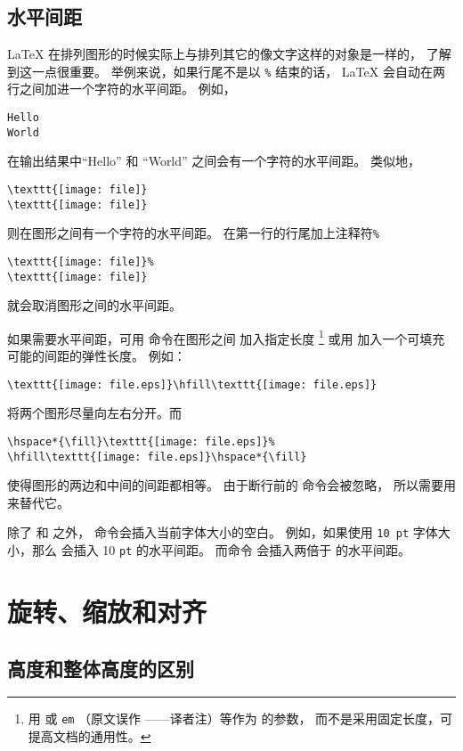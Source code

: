 \subsection{水平间距}\label{ssec:hspace}
\LaTeX{} 在排列图形的时候实际上与排列其它的像文字这样的对象是一样的，
了解到这一点很重要。
举例来说，如果行尾不是以 \texttt{\%} 结束的话，
\LaTeX{} 会自动在两行之间加进一个字符的水平间距。
例如，
\begin{lstlisting}
Hello
World
\end{lstlisting}
在输出结果中``Hello'' 和 ``World'' 之间会有一个字符的水平间距。
类似地，
\begin{lstlisting}
\texttt{[image: file]}
\texttt{[image: file]}
\end{lstlisting}
则在图形之间有一个字符的水平间距。
在第一行的行尾加上注释符\texttt{\%}
\begin{lstlisting}
\texttt{[image: file]}%
\texttt{[image: file]}
\end{lstlisting}
就会取消图形之间的水平间距。

如果需要水平间距，可用  命令在图形之间
加入指定长度
\footnote{
	用  或 \texttt{em} （原文误作 ——译者注）等作为  的参数，
	而不是采用固定长度，可提高文档的通用性。}
或用  加入一个可填充可能的间距的弹性长度。
例如：
\begin{lstlisting}
\texttt{[image: file.eps]}\hfill\texttt{[image: file.eps]}
\end{lstlisting}
将两个图形尽量向左右分开。而
\begin{lstlisting}
\hspace*{\fill}\texttt{[image: file.eps]}%
\hfill\texttt{[image: file.eps]}\hspace*{\fill}
\end{lstlisting}
使得图形的两边和中间的间距都相等。
由于断行前的  命令会被忽略，
所以需要用 来替代它。

除了  和  之外，
 命令会插入当前字体大小的空白。
例如，如果使用 \texttt{10 pt} 字体大小，那么  会插入 10 \texttt{pt} 的水平间距。
而命令  会插入两倍于  的水平间距。


\section{旋转、缩放和对齐}\label{sec:rotate-scale-align}

\subsection{高度和整体高度的区别}\label{ssec:diffheight}

